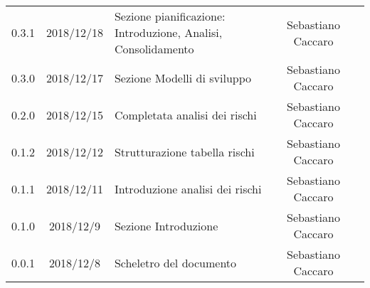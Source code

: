 {\begin{longtable}{ c c  C{4cm}  c  c }
		0.3.1 & 2018/12/18 & Sezione pianificazione: Introduzione, Analisi, Consolidamento & Sebastiano Caccaro & \reda{}\\
		
		0.3.0 & 2018/12/17 & Sezione Modelli di sviluppo & Sebastiano Caccaro & \reda{}\\
				
		0.2.0 & 2018/12/15 & Completata analisi dei rischi & Sebastiano Caccaro & \reda{}\\
				
		0.1.2 & 2018/12/12 & Strutturazione tabella rischi & Sebastiano Caccaro & \reda{}\\
				
		0.1.1 & 2018/12/11 & Introduzione analisi dei rischi & Sebastiano Caccaro & \reda{}\\
				
		0.1.0 & 2018/12/9 & Sezione Introduzione & Sebastiano Caccaro & \reda{}\\
		
		0.0.1 & 2018/12/8 & Scheletro del documento & Sebastiano Caccaro & \reda{}\\
		
	\end{longtable}

}